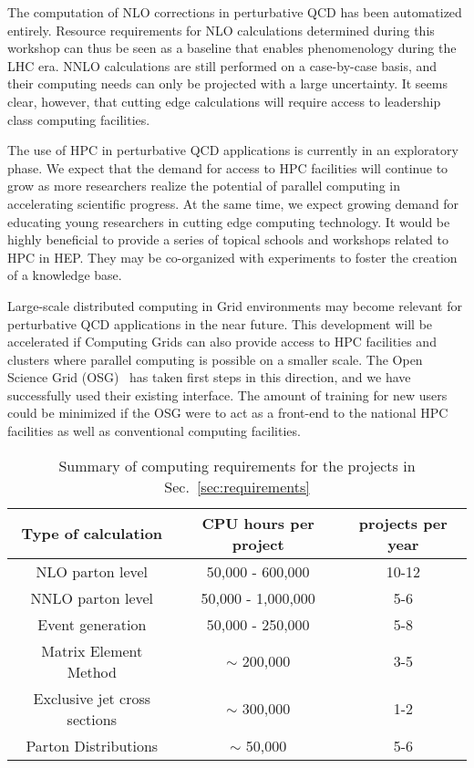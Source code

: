 The computation of NLO corrections in perturbative QCD has been automatized 
entirely. Resource requirements for NLO calculations determined during 
this workshop can thus be seen as a baseline that enables phenomenology 
during the LHC era. NNLO calculations are still performed 
on a case-by-case basis, and their computing needs can only be 
projected with a large uncertainty. It seems clear, however, that cutting edge 
calculations will require access to leadership class computing facilities.

The use of HPC in perturbative QCD applications is currently in
an exploratory phase. We expect that the demand for access to HPC
facilities will continue to grow as more researchers realize the 
potential of parallel computing in accelerating scientific progress. 
At the same time, we expect growing demand for educating young researchers 
in cutting edge computing technology. It would be highly beneficial 
to provide a series of topical schools and workshops related 
to HPC in HEP. They may be co-organized with experiments to foster 
the creation of a knowledge base.

Large-scale distributed computing in Grid environments 
may become relevant for perturbative QCD applications 
in the near future. This development will be accelerated if Computing Grids
can also provide access to HPC facilities and clusters where parallel 
computing is possible on a smaller scale. The Open Science Grid (OSG)~\cite{OSG} 
has taken first steps in this direction, and we have successfully used their
existing interface. The amount of training for new users could be minimized
if the OSG were to act as a front-end to the national HPC facilities
as well as conventional computing facilities.

\begin{table}
  \begin{tabular}{ccc}
    \hline
    Type of calculation & CPU hours per project & projects per year \\
    \hline\hline
    NLO parton level & 50,000 - 600,000 & 10-12\\
    NNLO parton level & 50,000 - 1,000,000 & 5-6\\
    Event generation & 50,000 - 250,000 & 5-8\\
    Matrix Element Method & $\sim$ 200,000 & 3-5\\
    Exclusive jet cross sections & $\sim$ 300,000 & 1-2\\
    Parton Distributions & $\sim$ 50,000 & 5-6\\
    \hline
  \end{tabular}
  \caption{Summary of computing requirements for the projects
    in Sec.~\ref{sec:requirements}
    \label{tab:summary}}
\end{table}


